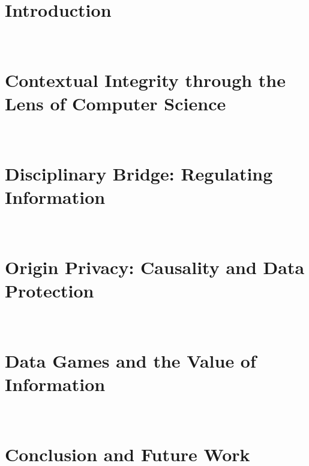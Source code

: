\documentclass[12pt, oneside]{lib/ucthesis}
\def\ssp{\def\baselinestretch{1.0}\large\normalsize}
\begin{document}
\tableofcontents
\listoffigures 
\listoftables

\begin{acknowledgements}
\thispagestyle{plain}
 
\end{acknowledgements}




\begin{dissertationText}
\chapter{Introduction}~\label{chapter:introduction}
	

\chapter[Contextual Integrity through the Lens of Computer Science]{Contextual Integrity through the Lens of Computer Science}~\label{chapter:CI-through-CS}


\chapter[Disciplinary Bridge]{Disciplinary Bridge: Regulating Information}~\label{chapter:bridge}


\chapter[Origin Privacy]{Origin Privacy: Causality and Data Protection}~\label{chapter:origin-privacy}
	

        \chapter[Data Games]{Data Games and the Value of Information}~\label{chapter:games-and-rules}


\chapter{Conclusion and Future Work}~\label{chapter:conclusion}


\ssp	%




\end{dissertationText}
\end{document}

